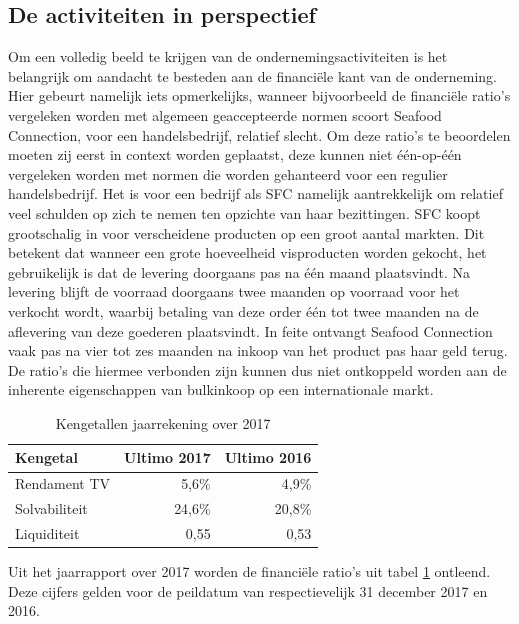 \documentclass[10pt,a4paper,oneside]{report}
\begin{document}
\subsection{De activiteiten in perspectief} \label{beschr:activiteiten}
Om een volledig beeld te krijgen van de ondernemingsactiviteiten is het belangrijk om aandacht te besteden aan de financiële kant van de onderneming. Hier gebeurt namelijk iets opmerkelijks, wanneer bijvoorbeeld de financiële ratio's vergeleken worden met algemeen geaccepteerde normen scoort Seafood Connection, voor een handelsbedrijf, relatief slecht. Om deze ratio’s te beoordelen moeten zij eerst in context worden geplaatst, deze kunnen niet één-op-één vergeleken worden met normen die worden gehanteerd voor een regulier handelsbedrijf. Het is voor een bedrijf als SFC namelijk aantrekkelijk om relatief veel schulden op zich te nemen ten opzichte van haar bezittingen. SFC koopt grootschalig in voor verscheidene producten op een groot aantal markten. Dit betekent dat wanneer een grote hoeveelheid visproducten worden gekocht, het gebruikelijk is dat de levering doorgaans pas na één maand plaatsvindt. Na levering blijft de voorraad doorgaans twee maanden op voorraad voor het verkocht wordt, waarbij betaling van deze order één tot twee maanden na de aflevering van deze goederen plaatsvindt. In feite ontvangt Seafood Connection vaak pas na vier tot zes maanden na inkoop van het product pas haar geld terug. De ratio’s die hiermee verbonden zijn kunnen dus niet ontkoppeld worden aan de inherente eigenschappen van bulkinkoop op een internationale markt. \citep{jaarrapport2017}

\begin{table}[h]
    \centering
    \caption{Kengetallen jaarrekening over 2017 \citep{jaarrapport2017}}
    \begin{tabular}{l r r}
        \toprule
        \textbf{Kengetal} & \textbf{Ultimo 2017} & \textbf{Ultimo 2016} \\
        \midrule
        Rendament TV & 5,6\% & 4,9\% \\
        Solvabiliteit & 24,6\% & 20,8\% \\
        Liquiditeit & 0,55 & 0,53 \\
        \bottomrule
    \end{tabular}
    \label{tab:kengetallen}
\end{table}

Uit het jaarrapport over 2017 worden de financiële ratio’s uit tabel \ref{tab:kengetallen} ontleend. Deze cijfers gelden voor de peildatum van respectievelijk 31 december 2017 en 2016.
\end{document}
